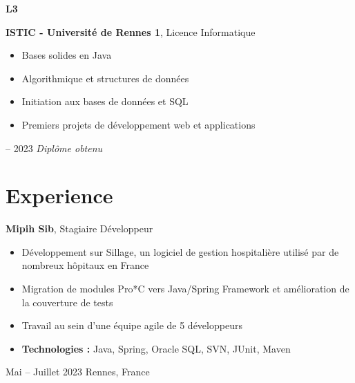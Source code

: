 \documentclass[10pt, letterpaper]{article}
\newenvironment{highlights}{
    \begin{itemize}[
        topsep=0.10 cm,
        parsep=0.10 cm,
        partopsep=0pt,
        itemsep=0pt,
        leftmargin=0.4 cm + 10pt
    ]
}{
    \end{itemize}
} %
\newenvironment{twocolentry}[2][]{
    \onecolentry
    \def\secondColumn{#2}
    \setcolumnwidth{\fill, 4.5 cm}
    \begin{paracol}{2}
}{
    \switchcolumn \raggedleft \secondColumn
    \end{paracol}
    \endonecolentry
} %
\newenvironment{threecolentry}[3][]{
    \onecolentry
    \def\thirdColumn{#3}
    \setcolumnwidth{1 cm, \fill, 4.5 cm}
    \begin{paracol}{3}
    {\raggedright #2} \switchcolumn
}{
    \switchcolumn \raggedleft \thirdColumn
    \end{paracol}
    \endonecolentry
} %
\begin{document}
        \vspace{0.2 cm}

        \begin{threecolentry}{\textbf{L3}}{
            2020 -- 2023
            \break
            \textit{Diplôme obtenu}
        }
            \textbf{ISTIC - Université de Rennes 1}, Licence Informatique
            \begin{highlights}
                \item Bases solides en Java
                \item Algorithmique et structures de données
                \item Initiation aux bases de données et SQL
                \item Premiers projets de développement web et applications
            \end{highlights}
        \end{threecolentry}

    \section{Experience}
        \begin{twocolentry}{
            Mai -- Juillet 2023
            \break
            Rennes, France
        }
            \textbf{Mipih Sib}, Stagiaire Développeur
            \begin{highlights}
                \item Développement sur Sillage, un logiciel de gestion hospitalière utilisé par de nombreux hôpitaux en France
                \item Migration de modules Pro*C vers Java/Spring Framework et amélioration de la couverture de tests
                \item Travail au sein d'une équipe agile de 5 développeurs
                \item \textbf{Technologies :} Java, Spring, Oracle SQL, SVN, JUnit, Maven
            \end{highlights}
        \end{twocolentry}
\end{document}

